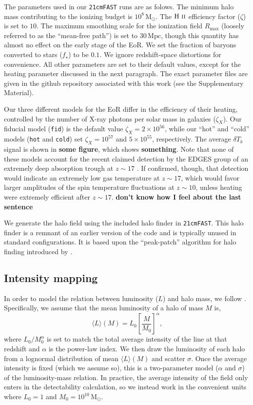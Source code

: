 \documentclass[a4paper,fleqn,usenatbib]{mnras}
\newcommand{\beq}{\begin{equation}}
\newcommand{\eeq}{\end{equation}}
\newcommand{\tfast}{\texttt{21cmFAST}}
\newcommand{\avg}[1]{\ensuremath{\langle #1 \rangle}}
\newcommand{\HII}{\ensuremath{\text{H~\textsc{ii}}}}
\newcommand{\Msun}{\ensuremath{\text{M}_\odot}}
\newcommand{\Mpc}{\ensuremath{\text{Mpc}}}
\newcommand{\fid}{\texttt{fid}}
\newcommand{\hot}{\texttt{hot}}
\newcommand{\cold}{\texttt{cold}}
\begin{document}
The parameters used in our \tfast{} runs are as folows. The minimum halo mass
contributing to the ionizing budget is $10^{8}\,\Msun$. The \HII{} efficiency
factor ($\zeta$) is set to $10$. The maximum smoothing scale for the
ionization field $R_{\text{max}}$ (loosely referred to as the ``mean-free
path'') is set to $30\,\Mpc$, though this quantity has almost no effect on the
early stage of the EoR. We set the fraction of baryons converted to stars
($f_\star$) to be $0.1$. We ignore redshift-space distortions for convenience.
All other parameters are set to their default values, except for the heating
parameter discussed in the next paragraph. The exact parameter files are given
in the github repository associated with this work (see the Supplementary
Material).

Our three different models for the EoR differ in the efficiency of their
heating, controlled by the number of X-ray photons per solar mass in galaxies
($\zeta_X$). Our fiducial model (\fid{}) is the default value
$\zeta_X=2\times10^{56}$, while our ``hot'' and ``cold'' models (\hot{} and
\cold{}) set $\zeta_X=10^{57}$ and $5\times10^{55}$, respectively. The average
$\delta T_b$ signal is shown in \textbf{some figure}, which shows
\textbf{something}. Note that none of these models account for the recent
claimed detection by the EDGES group of an extremely deep absorption trough at
$z\sim17$ \citep{2018Natur.555...67B}. If confirmed, though, that detection
would indicate an extremely low gas temperature at $z\sim17$, which would
favor larger amplitudes of the spin temperature fluctuations at $z\sim10$,
unless heating were extremely efficient after $z\sim17$. {\bf don't know how I
feel about the last sentence}

We generate the halo field using the included halo finder in \tfast{}. This
halo finder is a remnant of an earlier version of the code
\citep{2007ApJ...669..663M} and is typically unused in standard
configurations. It is based upon the ``peak-patch'' algorithm for halo finding
introduced by \citet{1996ApJS..103....1B}.

\subsection{Intensity mapping} \label{ssec:oiii_int_map}
In order to model the relation between luminosity ($L$) and
halo mass, we follow \citet{2019ApJ...874..133B}. Specifically, we assume that
the mean luminosity of a halo of mass $M$ is,
\beq \label{eq:lum_mass_relation}
\avg{L}(M) = L_0 \left[ \frac{M}{M_0} \right]^{\alpha}\text{,}
\eeq
where $L_0/M_0^{\alpha}$ is set to match the total average intensity of
the line at that redshift and $\alpha$ is the power-law index. We then draw the
luminosity of each halo from a lognormal distribution of mean $\avg{L}(M)$ and
scatter $\sigma$. Once the average intensity is fixed (which we assume so),
this is a two-parameter model ($\alpha$ and $\sigma$) of the
luminosity-mass relation. In practice, the average intensity of the field only
enters in the detectability calculation, so we instead work in the convenient
units where $L_0=1$ and $M_0=10^{10}\,\Msun$.
\end{document}
